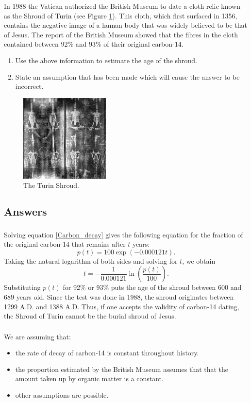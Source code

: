 \documentclass[10pt]{article}
\newcommand{\bb}{\begin{equation}}
\newcommand{\ee}{\end{equation}}
\newcommand{\see}[1]{(see Figure \ref{#1})}
\newcommand{\eqn}[1]{equation \eqref{#1}}
\renewcommand{\l}{\left(}
\renewcommand{\r}{\right)}
\begin{document}
In 1988 the Vatican authorized the British Museum to date a cloth relic known as the Shroud of Turin \see{Turing_shroud}. This cloth, which first surfaced in 1356, contains the negative image of a human body that was widely believed to be that of Jesus. The report of the British Museum showed that the fibres in the cloth contained between 92\% and 93\% of their original carbon-14.
\begin{enumerate}
\item Use the above information to estimate the age of the shroud.
\item State an assumption that has been made which will cause the answer to be incorrect.
\end{enumerate}
\begin{figure}[h!!!tb]
\centering
\includegraphics[width=0.4\textwidth]{../../Pictures/Turin_shroud.jpg}
\caption{\label{Turing_shroud} The Turin Shroud.}
\end{figure}
\begin{Answ}
\subsection{Answers}
\subsubsection{}
Solving \eqn{Carbon_decay} gives the following equation for the fraction of the original carbon-14 that remains after $t$ years:
\bb
p(t)=100\exp(-0.000121 t).
\ee
Taking the natural logarithm of both sides and solving for $t$, we obtain
\bb
t = -\frac{1}{0.000121}\ln\l \frac{p(t)}{100}\r.
\ee
Substituting $p(t)$ for 92\% or 93\% puts the age of the shroud between 600 and 689 years old. Since the test was done in 1988, the shroud originates between 1299 A.D. and 1388 A.D. Thus, if one accepts the validity of carbon-14 dating, the Shroud of Turin cannot be the burial shroud of Jesus.
\subsubsection{}
We are assuming that:
\begin{itemize}
\item the rate of decay of carbon-14 is constant throughout history.
\item the proportion estimated by the British Museum assumes that that the amount taken up by organic matter is a constant.
\item other assumptions are possible.
\end{itemize}
\end{Answ}
\end{document}
